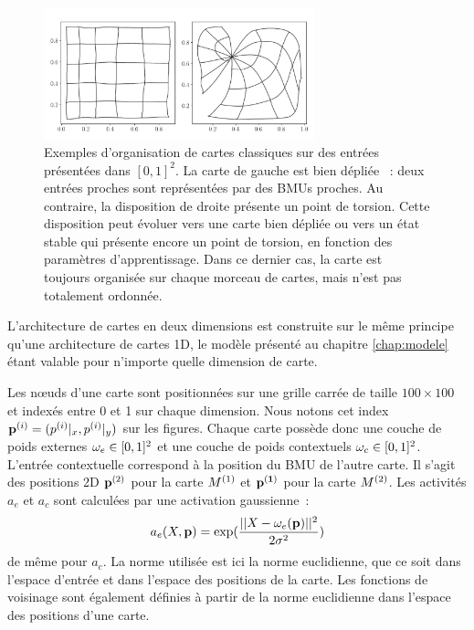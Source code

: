 \documentclass[../main]{subfiles}
\begin{document}
\begin{figure}
	\centering\includegraphics[width=0.7\textwidth]{grid_torsion.pdf}
	\caption{Exemples d'organisation de cartes classiques sur des entrées présentées dans $[0,1]^2$. 
	La carte de gauche est \og bien dépliée \fg{}~: deux entrées proches sont représentées par des BMUs proches. 
	Au contraire, la disposition de droite présente un point de torsion. Cette disposition peut évoluer vers une carte bien dépliée ou vers un état stable qui présente encore un point de torsion, en fonction des paramètres d'apprentissage. Dans ce dernier cas, la carte est toujours organisée sur chaque morceau de cartes, mais n'est pas totalement ordonnée. \label{fig:torsion}
	}
\end{figure}
L'architecture de cartes en deux dimensions est construite sur le même principe qu'une architecture de cartes 1D, le modèle présenté au chapitre \ref{chap:modele} étant valable pour n'importe quelle dimension de carte.

Les n\oe{}uds d'une carte sont positionnées sur une grille carrée de taille $100 \times 100$ et indexés entre 0 et 1 sur chaque dimension. Nous notons cet index $\mathbf{p}^{({i})} = (p^{({i})}|_x, p^{({i})}|_y)$ sur les figures. 
Chaque carte possède donc une couche de poids externes $\omega_{e} \in [0,1]^2$ et une couche de poids contextuels $\omega_c \in [0,1]^2$.
L'entrée contextuelle correspond à la position du BMU de l'autre carte. Il s'agit des positions 2D $\mathbf{p}^{({2})}$ pour la carte $M^{({1})}$ et $\mathbf{p^{({1})}}$ pour la carte $M^{({2})}$. 
Les activités $a_e$ et $a_c$ sont calculées par une activation gaussienne~:
$$a_e(X,\mathbf{p}) = \exp(\frac{||X - \omega_e(\mathbf{p}) ||^2}{2\sigma^2})$$
de même pour $a_c$.
La norme utilisée est ici la norme euclidienne, que ce soit dans l'espace d'entrée et dans l'espace des positions de la carte. Les fonctions de voisinage sont également définies à partir de la norme euclidienne dans l'espace des positions d'une carte.
\end{document}
